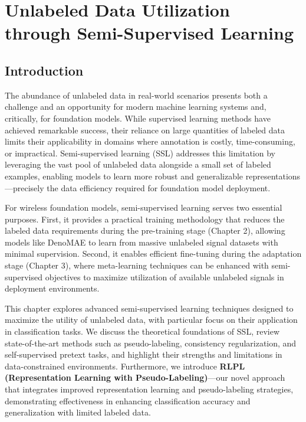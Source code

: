 \chapter{Unlabeled Data Utilization through Semi-Supervised Learning}

\section{Introduction}

The abundance of unlabeled data in real-world scenarios presents both a challenge and an opportunity for modern machine learning systems and, critically, for foundation models. While supervised learning methods have achieved remarkable success, their reliance on large quantities of labeled data limits their applicability in domains where annotation is costly, time-consuming, or impractical. Semi-supervised learning (SSL) addresses this limitation by leveraging the vast pool of unlabeled data alongside a small set of labeled examples, enabling models to learn more robust and generalizable representations—precisely the data efficiency required for foundation model deployment.

For wireless foundation models, semi-supervised learning serves two essential purposes. First, it provides a practical training methodology that reduces the labeled data requirements during the pre-training stage (Chapter 2), allowing models like DenoMAE to learn from massive unlabeled signal datasets with minimal supervision. Second, it enables efficient fine-tuning during the adaptation stage (Chapter 3), where meta-learning techniques can be enhanced with semi-supervised objectives to maximize utilization of available unlabeled signals in deployment environments.

This chapter explores advanced semi-supervised learning techniques designed to maximize the utility of unlabeled data, with particular focus on their application in classification tasks. We discuss the theoretical foundations of SSL, review state-of-the-art methods such as pseudo-labeling, consistency regularization, and self-supervised pretext tasks, and highlight their strengths and limitations in data-constrained environments. Furthermore, we introduce \textbf{RLPL (Representation Learning with Pseudo-Labeling)}—our novel approach that integrates improved representation learning and pseudo-labeling strategies, demonstrating effectiveness in enhancing classification accuracy and generalization with limited labeled data.

